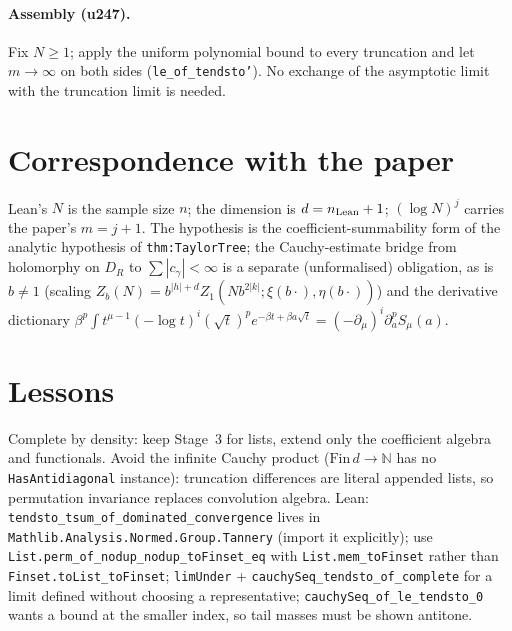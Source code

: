 \documentclass[11pt]{article}
\begin{document}
\paragraph{Assembly (u247).} Fix $N\ge1$; apply the uniform polynomial bound to every truncation and
let $m\to\infty$ on both sides (\texttt{le\_of\_tendsto'}). No exchange of the asymptotic limit with the
truncation limit is needed.

\section{Correspondence with the paper}
Lean's $N$ is the sample size $n$; the dimension is $d=n_{\rm Lean}+1$; $(\log N)^j$ carries the
paper's $m=j+1$. The hypothesis is the coefficient-summability form of the analytic hypothesis of
\texttt{thm:TaylorTree}; the Cauchy-estimate bridge from holomorphy on $D_R$ to $\sum|c_\gamma|<\infty$ is
a separate (unformalised) obligation, as is $b\neq1$ (scaling
$Z_b(N)=b^{|h|+d}Z_1(Nb^{2|k|};\xi(b\cdot),\eta(b\cdot))$) and the derivative dictionary
$\beta^p\!\int t^{\mu-1}(-\log t)^i(\sqrt t)^pe^{-\beta t+\beta a\sqrt t}=(-\partial_\mu)^i\partial_a^pS_\mu(a)$.

\section{Lessons}
Complete by density: keep Stage~3 for lists, extend only the coefficient algebra and functionals.
Avoid the infinite Cauchy product ($\mathrm{Fin}\,d\to\mathbb N$ has no \texttt{HasAntidiagonal}
instance): truncation differences are literal appended lists, so permutation invariance replaces
convolution algebra. Lean: \texttt{tendsto\_tsum\_of\_dominated\_convergence} lives in
\texttt{Mathlib.Analysis.Normed.Group.Tannery} (import it explicitly); use
\texttt{List.perm\_of\_nodup\_nodup\_toFinset\_eq} with \texttt{List.mem\_toFinset} rather than
\texttt{Finset.toList\_toFinset}; \texttt{limUnder} + \texttt{cauchySeq\_tendsto\_of\_complete} for a limit
defined without choosing a representative; \texttt{cauchySeq\_of\_le\_tendsto\_0} wants a bound at the
smaller index, so tail masses must be shown antitone.
\end{document}
